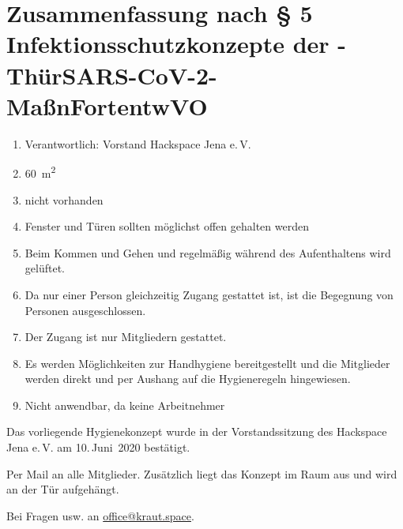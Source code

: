 \documentclass[a4paper,12pt,parskip=half]{scrartcl}
\begin{document}
\section*{Zusammenfassung nach § 5 Infektionsschutzkonzepte der -ThürSARS-CoV-2-
MaßnFortentwVO}
\begin{enumerate}
 \item Verantwortlich: Vorstand Hackspace Jena e.\,V.
 \item \SI{60}{\square\metre}
 \item nicht vorhanden
 \item Fenster und Türen sollten möglichst offen gehalten werden
 \item Beim Kommen und Gehen und regelmäßig während des Aufenthaltens wird gelüftet.
 \item Da nur einer Person gleichzeitig Zugang gestattet ist, ist die Begegnung von Personen ausgeschlossen.
 \item Der Zugang ist nur Mitgliedern gestattet.
 \item Es werden Möglichkeiten zur Handhygiene bereitgestellt und die Mitglieder werden direkt und per Aushang auf die Hygieneregeln hingewiesen.
 \item Nicht anwendbar, da keine Arbeitnehmer
\end{enumerate}

Das vorliegende Hygienekonzept wurde in der Vorstandssitzung des Hackspace Jena e.\,V. am 10.\,Juni~2020 bestätigt.

Per Mail an alle Mitglieder. Zusätzlich liegt das Konzept im Raum aus und wird an der Tür aufgehängt.

Bei Fragen usw. an \href{mailto:office@kraut.space}{office@kraut.space}.
\end{document}
